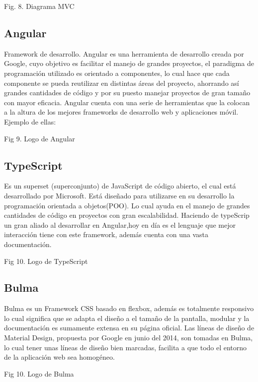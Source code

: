 Fig. 8. Diagrama MVC





\subsection{Angular}
Framework de desarrollo.
Angular es una herramienta de desarrollo creada por Google, cuyo objetivo es facilitar el manejo de grandes proyectos, el paradigma de programación utilizado es orientado a componentes, lo cual hace que cada componente se pueda reutilizar en distintas áreas del proyecto, ahorrando así grandes cantidades de código y por su puesto manejar proyectos de gran tamaño con mayor eficacia. Angular cuenta con una serie de herramientas que la colocan a la altura de los mejores frameworks de desarrollo web y aplicaciones móvil. \cite{Angular} Ejemplo de ellas:


Fig 9. Logo de Angular



\subsection{TypeScript}
Es un superset (superconjunto) de JavaScript de código abierto, el cual está desarrollado por Microsoft. Está diseñado para utilizarse en su desarrollo la programación orientada a objetos(POO). Lo cual ayuda en el manejo de grandes cantidades de código en proyectos con gran escalabilidad. Haciendo de typeScrip un gran aliado al desarrollar en Angular,hoy en día es el lenguaje que mejor interacción tiene con este framework, además cuenta con una vasta documentación.\cite{typeScript}




Fig 10. Logo de TypeScript



\subsection{Bulma}
Bulma es un Framework CSS basado en flexbox, además es totalmente responsivo lo cual significa que se adapta el diseño a el tamaño de la pantalla, modular y la documentación es sumamente extensa en su página oficial.
Las líneas de diseño de Material Design, propuesta por Google en junio del 2014, son tomadas en Bulma, lo cual tener unas líneas de diseño bien marcadas, facilita a que todo el entorno de la aplicación web sea homogéneo.\cite{Bulma}


Fig 10. Logo de Bulma


